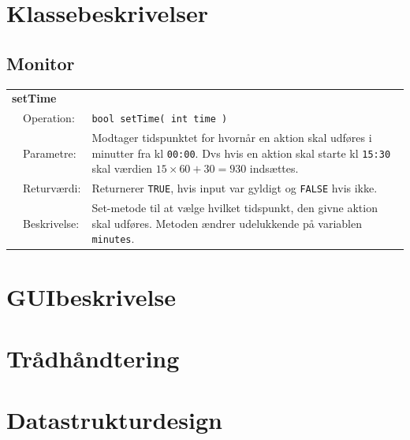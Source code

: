 \section{Klassebeskrivelser}

\subsection{Monitor}

\begin{table}[h] 
\begin{tabularx}{\textwidth}{p{0.6 cm} l X} %
\multicolumn{3}{l}{\textbf{setTime}}\\
& Operation: & %
\texttt{bool setTime( int time ) }
\\ & Parametre: & %
Modtager tidspunktet for hvornår en aktion skal udføres i minutter fra kl \texttt{00:00}. Dvs hvis en aktion skal starte kl \texttt{15:30} skal værdien $15 \times 60 + 30 = 930$ indsættes.
\\ & Returværdi: & %
Returnerer \texttt{TRUE}, hvis input var gyldigt og \texttt{FALSE} hvis ikke.
\\ & Beskrivelse: & %
Set-metode til at vælge hvilket tidspunkt, den givne aktion skal udføres. Metoden ændrer udelukkende på variablen \texttt{minutes}.
\\ \end{tabularx}
\end{table}


\section{GUIbeskrivelse}

\section{Trådhåndtering}

\section{Datastrukturdesign}